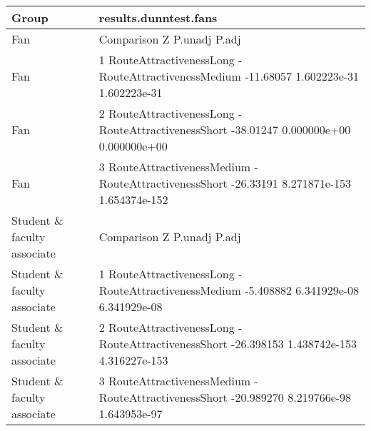 \begin{tabular}{ll}
  \hline
Group & results.dunntest.fans \\ 
  \hline
Fan &                                             Comparison         Z       P.unadj         P.adj \\ 
  Fan & 1  RouteAttractivenessLong - RouteAttractivenessMedium -11.68057  1.602223e-31  1.602223e-31 \\ 
  Fan & 2   RouteAttractivenessLong - RouteAttractivenessShort -38.01247  0.000000e+00  0.000000e+00 \\ 
  Fan & 3 RouteAttractivenessMedium - RouteAttractivenessShort -26.33191 8.271871e-153 1.654374e-152 \\ 
  Student \& faculty associate &                                             Comparison          Z       P.unadj         P.adj \\ 
  Student \& faculty associate & 1  RouteAttractivenessLong - RouteAttractivenessMedium  -5.408882  6.341929e-08  6.341929e-08 \\ 
  Student \& faculty associate & 2   RouteAttractivenessLong - RouteAttractivenessShort -26.398153 1.438742e-153 4.316227e-153 \\ 
  Student \& faculty associate & 3 RouteAttractivenessMedium - RouteAttractivenessShort -20.989270  8.219766e-98  1.643953e-97 \\ 
   \hline
\end{tabular}

